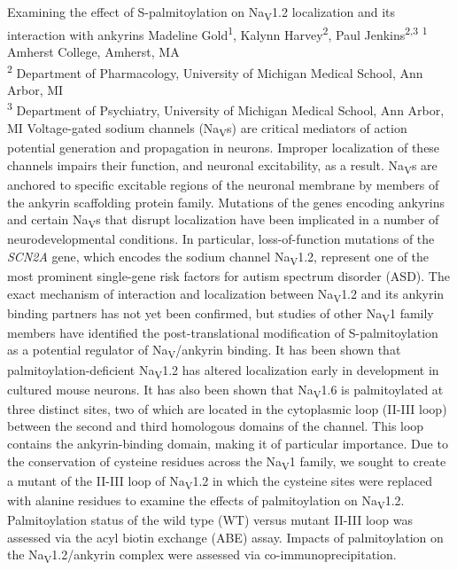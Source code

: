 \makeabstract
{ %
Examining the effect of S-palmitoylation on Na\textsubscript{V}1.2 localization and its interaction with ankyrins
}
{ %
Madeline Gold\textsuperscript{1},
Kalynn Harvey\textsuperscript{2},
Paul Jenkins\textsuperscript{2,3}
}
{ %
\textsuperscript{1} Amherst College, Amherst, MA\\
\textsuperscript{2} Department of Pharmacology, University of Michigan Medical School, Ann Arbor, MI\\
\textsuperscript{3} Department of Psychiatry, University of Michigan Medical School, Ann Arbor, MI
}
{ %
Voltage-gated sodium channels (Na\textsubscript{V}s) are critical mediators of action potential generation and propagation in neurons. Improper localization of these channels impairs their function, and neuronal excitability, as a result. Na\textsubscript{V}s are anchored to specific excitable regions of the neuronal membrane by members of the ankyrin scaffolding protein family. Mutations of the genes encoding ankyrins and certain Na\textsubscript{V}s that disrupt localization have been implicated in a number of neurodevelopmental conditions. In particular, loss-of-function mutations of the \textit{SCN2A} gene, which encodes the sodium channel Na\textsubscript{V}1.2, represent one of the most prominent single-gene risk factors for autism spectrum disorder (ASD). The exact mechanism of interaction and localization between Na\textsubscript{V}1.2 and its ankyrin binding partners has not yet been confirmed, but studies of other Na\textsubscript{V}1 family members have identified the post-translational modification of S-palmitoylation as a potential regulator of Na\textsubscript{V}/ankyrin binding. It has been shown that palmitoylation-deficient Na\textsubscript{V}1.2 has altered localization early in development in cultured mouse neurons. It has also been shown that Na\textsubscript{V}1.6 is palmitoylated at three distinct sites, two of which are located in the cytoplasmic loop (II-III loop) between the second and third homologous domains of the channel. This loop contains the ankyrin-binding domain, making it of particular importance.
}
{ %
Due to the conservation of cysteine residues across the Na\textsubscript{V}1 family, we sought to create a mutant of the II-III loop of Na\textsubscript{V}1.2 in which the cysteine sites were replaced with alanine residues to examine the effects of palmitoylation on Na\textsubscript{V}1.2. Palmitoylation status of the wild type (WT) versus mutant II-III loop was assessed via the acyl biotin exchange (ABE) assay. Impacts of palmitoylation on the Na\textsubscript{V}1.2/ankyrin complex were assessed via co-immunoprecipitation.
}
